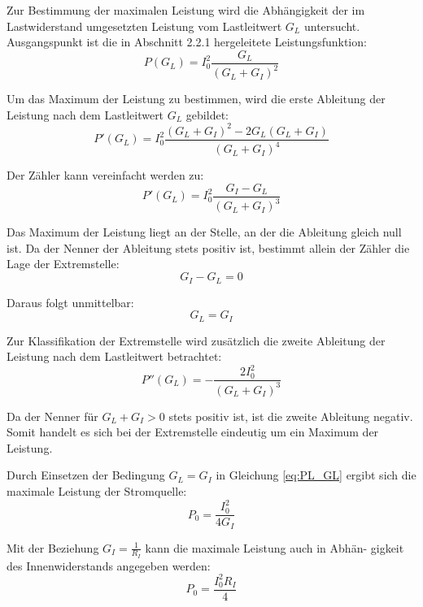 
\noindent
Zur Bestimmung der maximalen Leistung wird die Abhängigkeit der im Lastwiderstand
umgesetzten Leistung vom Lastleitwert $G_L$ untersucht. Ausgangspunkt ist die in
Abschnitt 2.2.1 hergeleitete Leistungsfunktion:
\begin{equation}
\label{eq:PL_GL}
P(G_L) = I_0^2 \frac{G_L}{(G_L + G_I)^2}
\end{equation}

\noindent
Um das Maximum der Leistung zu bestimmen, wird die erste Ableitung der Leistung
nach dem Lastleitwert $G_L$ gebildet:
\begin{equation}
\label{eq:dP_dGL}
P'(G_L) = I_0^2 \frac{(G_L + G_I)^2 - 2G_L(G_L + G_I)}{(G_L + G_I)^4}
\end{equation}

\noindent
Der Zähler kann vereinfacht werden zu:
\begin{equation}
\label{eq:dP_dGL_simpl}
P'(G_L) = I_0^2 \frac{G_I - G_L}{(G_L + G_I)^3}
\end{equation}

\noindent
Das Maximum der Leistung liegt an der Stelle, an der die Ableitung gleich null ist.
Da der Nenner der Ableitung stets positiv ist, bestimmt allein der Zähler die Lage der
Extremstelle:
\begin{equation}
\label{eq:nullstelle_GL}
G_I - G_L = 0
\end{equation}

\noindent
Daraus folgt unmittelbar:
\begin{equation}
\label{eq:GL_eq_GI}
G_L = G_I
\end{equation}

\noindent
Zur Klassifikation der Extremstelle wird zusätzlich die zweite Ableitung der Leistung
nach dem Lastleitwert betrachtet:
\begin{equation}
\label{eq:d2P_dGL2}
P''(G_L) = -\frac{2I_0^2}{(G_L + G_I)^3}
\end{equation}

\noindent
Da der Nenner für $G_L + G_I > 0$ stets positiv ist, ist die zweite Ableitung negativ.
Somit handelt es sich bei der Extremstelle eindeutig um ein Maximum der Leistung.

\noindent
Durch Einsetzen der Bedingung $G_L = G_I$ in Gleichung \eqref{eq:PL_GL} ergibt sich
die maximale Leistung der Stromquelle:
\begin{equation}
\label{eq:P0_stromquelle}
P_0 = \frac{I_0^2}{4G_I}
\end{equation}

\noindent
Mit der Beziehung $G_I = \frac{1}{R_I}$ kann die maximale Leistung auch in Abhän-
gigkeit des Innenwiderstands angegeben werden:
\begin{equation}
\label{eq:P0_stromquelle_R}
P_0 = \frac{I_0^2 R_I}{4}
\end{equation}
